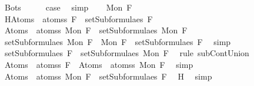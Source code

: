 \begin{isabellebody}
\ Bot{\isacharunderscore}s\isanewline
\ \ \isamarkupfalse%
\ \isamarkupfalse%
\ {\isacharquery}case\ \isamarkupfalse%
\ simp\isanewline
{}\isamarkupfalse%
\isanewline
\ \ \isamarkupfalse%
\ {\isacharparenleft}Mon\ F{\isacharparenright}\isanewline
\ \ \isamarkupfalse%
\ H{\isacharcolon}{\isachardoublequoteopen}Atom{\isacharunderscore}s\ {\isacharbackquote}\ atoms{\isacharunderscore}s\ F\ {\isasymsubseteq}\ setSubformulae{\isacharunderscore}s\ F{\isachardoublequoteclose}\isanewline
\ \ \isamarkupfalse%
\ {\isachardoublequoteopen}Atom{\isacharunderscore}s\ {\isacharbackquote}\ atoms{\isacharunderscore}s\ {\isacharparenleft}Mon\ F{\isacharparenright}\ {\isasymsubseteq}\ setSubformulae{\isacharunderscore}s\ {\isacharparenleft}Mon\ F{\isacharparenright}{\isachardoublequoteclose}\isanewline
\ \ \isamarkupfalse%
\ {\isacharminus}\isanewline
\ \ \ \ \isamarkupfalse%
\ {\isachardoublequoteopen}setSubformulae{\isacharunderscore}s\ {\isacharparenleft}Mon\ F{\isacharparenright}\ {\isacharequal}\ {\isacharbraceleft}Mon\ F{\isacharbraceright}\ {\isasymunion}\ setSubformulae{\isacharunderscore}s\ F{\isachardoublequoteclose}\ \isamarkupfalse%
\ simp\isanewline
\ \ \ \ \isamarkupfalse%
\ \isamarkupfalse%
\ {}{\isacharcolon}{\isachardoublequoteopen}setSubformulae{\isacharunderscore}s\ F\ {\isasymsubseteq}\ setSubformulae{\isacharunderscore}s\ {\isacharparenleft}Mon\ F{\isacharparenright}{\isachardoublequoteclose}\ \isamarkupfalse%
\ {\isacharparenleft}rule\ subContUnion{}{\isacharparenright}\isanewline
\ \ \ \ \isamarkupfalse%
\ \isamarkupfalse%
\ {\isachardoublequoteopen}Atom{\isacharunderscore}s\ {\isacharbackquote}\ atoms{\isacharunderscore}s\ F\ {\isacharequal}\ Atom{\isacharunderscore}s\ {\isacharbackquote}\ atoms{\isacharunderscore}s\ {\isacharparenleft}Mon\ F{\isacharparenright}{\isachardoublequoteclose}\ \isamarkupfalse%
\ simp\ \isanewline
\ \ \ \ \isamarkupfalse%
\ \isamarkupfalse%
\ {\isachardoublequoteopen}Atom{\isacharunderscore}s\ {\isacharbackquote}\ atoms{\isacharunderscore}s\ {\isacharparenleft}Mon\ F{\isacharparenright}\ {\isasymsubseteq}\ setSubformulae{\isacharunderscore}s\ F{\isachardoublequoteclose}\ \isamarkupfalse%
\ H\ \isamarkupfalse%
\ simp\ \isanewline
\ \ \ \ \isamarkupfalse%
\ \isamarkupfalse%

\end{isabellebody}
